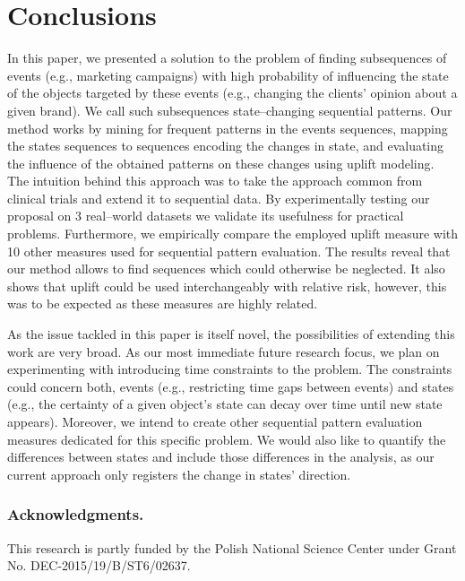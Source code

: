 \documentclass[runningheads,a4paper]{llncs}
\begin{document}
\section{Conclusions}
\label{sec:conclusions}
In this paper, we presented a solution to the problem of finding subsequences of events (e.g., marketing campaigns) with high probability of influencing the state of the objects targeted by these events (e.g., changing the clients’ opinion about a given brand).
We call such subsequences state--changing sequential patterns.
Our method works by mining for frequent patterns in the events sequences, mapping the states sequences to sequences encoding the changes in state, and evaluating the influence of the obtained patterns on these changes using uplift modeling.
The intuition behind this approach was to take the approach common from clinical trials and extend it to sequential data.
By experimentally testing our proposal on 3 real--world datasets we validate its usefulness for practical problems.
Furthermore, we empirically compare the employed uplift measure with 10 other measures used for sequential pattern evaluation.
The results reveal that our method allows to find sequences which could otherwise be neglected.
It also shows that uplift could be used interchangeably with relative risk, however, this was to be expected as these measures are highly related.

As the issue tackled in this paper is itself novel, the possibilities of extending this work are very broad.
As our most immediate future research focus, we plan on experimenting with introducing time constraints to the problem.
The constraints could concern both, events (e.g., restricting time gaps between events) and states (e.g., the certainty of a given object's state can decay over time until new state appears).
Moreover, we intend to create other sequential pattern evaluation measures dedicated for this specific problem.
We would also like to quantify the differences between states and include those differences in the analysis, as our current approach only registers the change in states' direction.

\subsubsection*{Acknowledgments.} This research is partly funded by the Polish National Science Center under Grant No. DEC-2015/19/B/ST6/02637.



\end{document}
